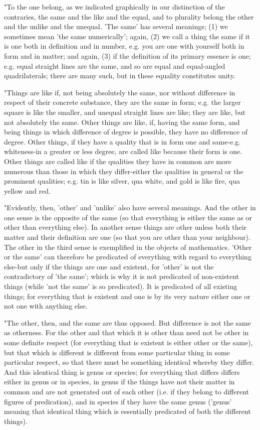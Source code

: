 "To the one belong, as we indicated graphically in our distinction
of the contraries, the same and the like and the equal, and to plurality
belong the other and the unlike and the unequal. 'The same' has several
meanings; (1) we sometimes mean 'the same numerically'; again, (2)
we call a thing the same if it is one both in definition and in number,
e.g. you are one with yourself both in form and in matter; and again,
(3) if the definition of its primary essence is one; e.g. equal straight
lines are the same, and so are equal and equal-angled quadrilaterals;
there are many such, but in these equality constitutes unity.

"Things are like if, not being absolutely the same, nor without difference
in respect of their concrete substance, they are the same in form;
e.g. the larger square is like the smaller, and unequal straight lines
are like; they are like, but not absolutely the same. Other things
are like, if, having the same form, and being things in which difference
of degree is possible, they have no difference of degree. Other things,
if they have a quality that is in form one and same-e.g. whiteness-in
a greater or less degree, are called like because their form is one.
Other things are called like if the qualities they have in common
are more numerous than those in which they differ-either the qualities
in general or the prominent qualities; e.g. tin is like silver, qua
white, and gold is like fire, qua yellow and red. 

"Evidently, then, 'other' and 'unlike' also have several meanings.
And the other in one sense is the opposite of the same (so that everything
is either the same as or other than everything else). In another sense
things are other unless both their matter and their definition are
one (so that you are other than your neighbour). The other in the
third sense is exemplified in the objects of mathematics. 'Other or
the same' can therefore be predicated of everything with regard to
everything else-but only if the things are one and existent, for 'other'
is not the contradictory of 'the same'; which is why it is not predicated
of non-existent things (while 'not the same' is so predicated). It
is predicated of all existing things; for everything that is existent
and one is by its very nature either one or not one with anything
else. 

"The other, then, and the same are thus opposed. But difference is
not the same as otherness. For the other and that which it is other
than need not be other in some definite respect (for everything that
is existent is either other or the same), but that which is different
is different from some particular thing in some particular respect,
so that there must be something identical whereby they differ. And
this identical thing is genus or species; for everything that differs
differs either in genus or in species, in genus if the things have
not their matter in common and are not generated out of each other
(i.e. if they belong to different figures of predication), and in
species if they have the same genus ('genus' meaning that identical
thing which is essentially predicated of both the different things).

